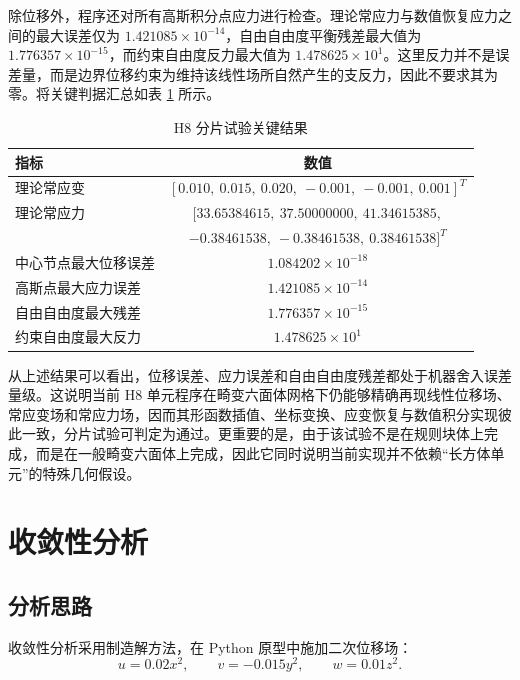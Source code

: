 \documentclass[12pt,a4paper]{article}
\begin{document}
除位移外，程序还对所有高斯积分点应力进行检查。理论常应力与数值恢复应力之间的最大误差仅为 $1.421085\times10^{-14}$，自由自由度平衡残差最大值为 $1.776357\times10^{-15}$，而约束自由度反力最大值为 $1.478625\times10^{1}$。这里反力并不是误差量，而是边界位移约束为维持该线性场所自然产生的支反力，因此不要求其为零。将关键判据汇总如表 \ref{tab:patch_metrics} 所示。

\begin{table}[htbp]
\centering
\caption{H8 分片试验关键结果}
\label{tab:patch_metrics}
\begin{tabular}{lc}
\toprule
指标 & 数值 \\
\midrule
理论常应变 & $[0.010,\ 0.015,\ 0.020,\ -0.001,\ -0.001,\ 0.001]^T$ \\
理论常应力 & $[33.65384615,\ 37.50000000,\ 41.34615385,$ \\
 & $-0.38461538,\ -0.38461538,\ 0.38461538]^T$ \\
中心节点最大位移误差 & $1.084202\times10^{-18}$ \\
高斯点最大应力误差 & $1.421085\times10^{-14}$ \\
自由自由度最大残差 & $1.776357\times10^{-15}$ \\
约束自由度最大反力 & $1.478625\times10^{1}$ \\
\bottomrule
\end{tabular}
\end{table}

从上述结果可以看出，位移误差、应力误差和自由自由度残差都处于机器舍入误差量级。这说明当前 H8 单元程序在畸变六面体网格下仍能够精确再现线性位移场、常应变场和常应力场，因而其形函数插值、坐标变换、应变恢复与数值积分实现彼此一致，分片试验可判定为通过。更重要的是，由于该试验不是在规则块体上完成，而是在一般畸变六面体上完成，因此它同时说明当前实现并不依赖“长方体单元”的特殊几何假设。

\section{收敛性分析}

\subsection{分析思路}

收敛性分析采用制造解方法，在 Python 原型中施加二次位移场：
\begin{equation}
u = 0.02x^2, \qquad v = -0.015y^2, \qquad w = 0.01z^2.
\end{equation}
\end{document}
